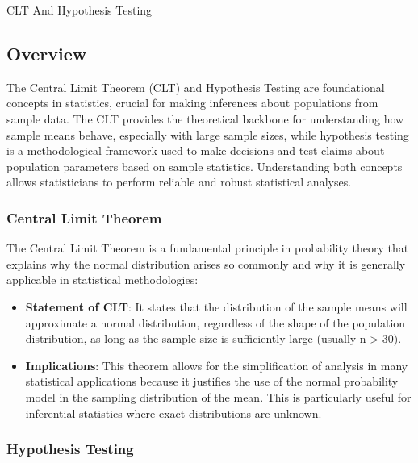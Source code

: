 \begin{notes}{CLT And Hypothesis Testing}
    \subsection*{Overview}

    The Central Limit Theorem (CLT) and Hypothesis Testing are foundational concepts in statistics, crucial for making inferences about populations from sample data. The CLT provides the theoretical 
    backbone for understanding how sample means behave, especially with large sample sizes, while hypothesis testing is a methodological framework used to make decisions and test claims about 
    population parameters based on sample statistics. Understanding both concepts allows statisticians to perform reliable and robust statistical analyses. \vspace*{1em}
    
    \subsubsection*{Central Limit Theorem}
    
    The Central Limit Theorem is a fundamental principle in probability theory that explains why the normal distribution arises so commonly and why it is generally applicable in statistical methodologies:
    \begin{itemize}
        \item \textbf{Statement of CLT}: It states that the distribution of the sample means will approximate a normal distribution, regardless of the shape of the population distribution, as long as 
        the sample size is sufficiently large (usually n > 30).
        \item \textbf{Implications}: This theorem allows for the simplification of analysis in many statistical applications because it justifies the use of the normal probability model in the sampling 
        distribution of the mean. This is particularly useful for inferential statistics where exact distributions are unknown.
    \end{itemize}
    
    \subsubsection*{Hypothesis Testing}
    

\end{notes}
